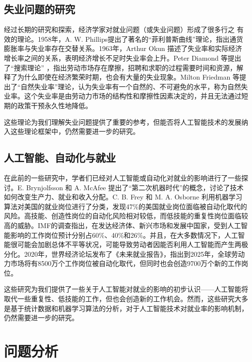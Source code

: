 \documentclass{article}
\begin{document}
\subsection{失业问题的研究}

经过长期的研究和探索，经济学家对就业问题（或失业问题）形成了很多行之
有效的理论。1958年，A. W. Phillips提出了著名的“菲利普斯曲线”理论\cite{phillips1958relation}，指出通货膨胀率与失业率存在交替关系。1963年，Arthur Okun \cite{okun1963potential} 描述了失业率和实际经济增长率之间的关系，表明经济增长不足时失业率会上升。Peter Diamond 等提出了“搜索理论”\cite{diamond1982aggregate} \cite{mortensen1982property}，指出劳动市场存在摩擦，招聘和求职的过程需要时间和资源，解释了为什么即使在经济繁荣时期，也会有大量的失业现象。Milton Friedman 等提出了“自然失业率”理论\cite{friedman1995role}，认为失业率有一个自然的、不可避免的水平，称为自然失业率。这个失业率是由劳动力市场的结构性和摩擦性因素决定的，并且无法通过短期的政策干预永久性地降低。

这些理论为我们理解失业问题提供了重要的参考，但能否将人工智能技术的发展纳入这些理论框架中，仍然需要进一步的研究。

\subsection{人工智能、自动化与就业}

在此前的一些研究中，学者们已经对人工智能或自动化对就业的影响进行了一些探讨。E. Brynjolfsson 和 A. McAfee 提出了“第二次机器时代”\cite{brynjolfsson2014second}的概念，讨论了技术如何改变生产力、就业和收入分配。C. B. Frey 和 M. A. Osborne\cite{frey2017future} 利用机器学习算法对美国的就业岗位进行了分类，发现47\%的美国就业岗位面临被自动化取代的风险。高技能、创造性岗位的自动化风险相对较低，而低技能的重复性岗位面临较高的威胁。IMF的调查\cite{imf2024ai}指出，在发达经济体、新兴市场和发展中国家，受到人工智能影响的工作岗位预计分别占60\%、40\%和26\%。并且，在大多数情况下，人工智能很可能会加剧总体不平等状况，可能导致劳动者因能否利用人工智能而产生两极分化。2020年，世界经济论坛发布了《未来就业报告》\cite{wef2020futureofjobs}，指出到2025年，全球劳动力市场将有8500万个工作岗位被自动化取代，但同时也会创造9700万个新的工作岗位。

这些研究为我们提供了一些关于人工智能对就业的影响的初步认识——人工智能将取代一些重复性、低技能的工作，但也会创造新的工作机会。然而，这些研究大多是基于统计数据和机器学习算法的分析，对于人工智能技术对就业率的影响机制，仍然需要进一步的研究。

\section{问题分析}
\end{document}
